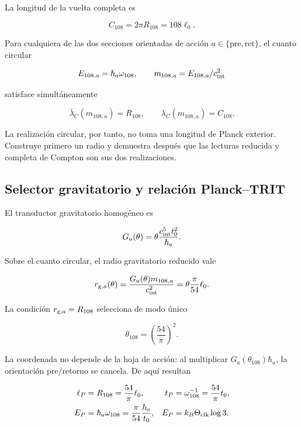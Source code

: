 La longitud de la vuelta completa es

\begin{equation}
C_{108}=2\pi R_{108}=108\ell_0.
\label{rm:eq:cosmo-C108}
\end{equation}

Para cualquiera de las dos secciones orientadas de acci\'on
\(a\in\{\mathrm{pre},\mathrm{ret}\}\), el cuanto circular

\[
E_{108,a}=\hbar_a\omega_{108},
\qquad
m_{108,a}=E_{108,a}/c_{\rm int}^2
\]

satisface simult\'aneamente

\begin{equation}
\bar\lambda_C(m_{108,a})=R_{108},
\qquad
\lambda_C(m_{108,a})=C_{108}.
\label{rm:eq:cosmo-compton}
\end{equation}

La realizaci\'on circular, por tanto, no toma una longitud de Planck exterior.
Construye primero un radio y demuestra despu\'es que las lecturas reducida y
completa de Compton son sus dos realizaciones.

\subsection{Selector gravitatorio y relaci\'on Planck--TRIT}

El transductor gravitatorio homog\'eneo es

\begin{equation}
G_a(\theta)=\theta\frac{c_{\rm int}^5t_0^2}{\hbar_a}.
\label{rm:eq:cosmo-Gtheta}
\end{equation}

Sobre el cuanto circular, el radio gravitatorio reducido vale

\[
r_{{\rm g},a}(\theta)
=\frac{G_a(\theta)m_{108,a}}{c_{\rm int}^2}
=\theta\frac{\pi}{54}\ell_0.
\]

La condici\'on \(r_{{\rm g},a}=R_{108}\) selecciona de modo \'unico

\begin{equation}
\theta_{108}=\left(\frac{54}{\pi}\right)^2.
\label{rm:eq:cosmo-theta108}
\end{equation}

La coordenada no depende de la hoja de acci\'on: al multiplicar
\(G_a(\theta_{108})\hbar_a\), la orientaci\'on pre/retorno se cancela. De aqu\'i
resultan

\begin{align}
\ell_P&=R_{108}=\frac{54}{\pi}\ell_0,
&
t_P&=\omega_{108}^{-1}=\frac{54}{\pi}t_0,
\label{rm:eq:cosmo-planck-length-time}\\
E_P&=\hbar_a\omega_{108}
=\frac{\pi}{54}\frac{\hbar_a}{t_0},
&
E_P&=k_B\Theta_{\rm clk}\log3.
\label{rm:eq:cosmo-planck-trit}
\end{align}

